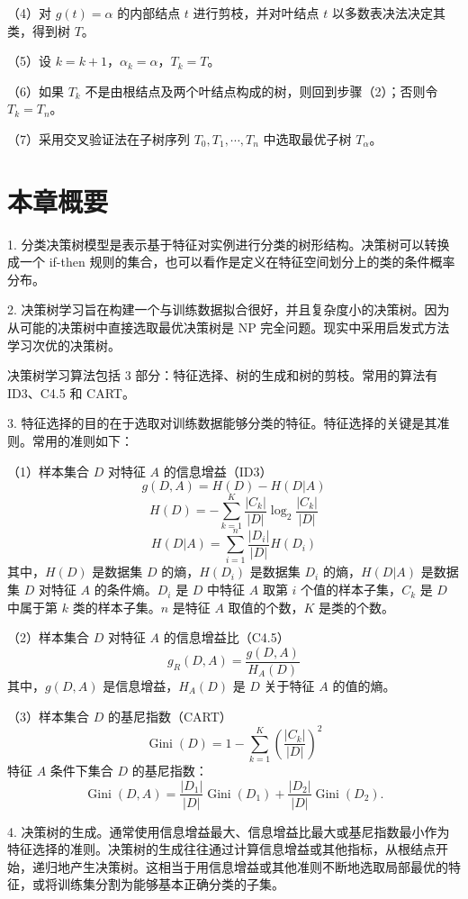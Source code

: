 \documentclass[UTF8,12pt,a4paper,fontset=fandol]{ctexart}
\begin{document}
（4）对 $g(t)=\alpha$ 的内部结点 $t$ 进行剪枝，并对叶结点 $t$ 以多数表决法决定其类，得到树 $T$。

（5）设 $k=k+1$，$\alpha_k=\alpha$，$T_k=T$。

（6）如果 $T_k$ 不是由根结点及两个叶结点构成的树，则回到步骤（2）；否则令 $T_k=T_n$。

（7）采用交叉验证法在子树序列 $T_0,T_1,\cdots,T_n$ 中选取最优子树 $T_\alpha$。

\section*{本章概要}

1. 分类决策树模型是表示基于特征对实例进行分类的树形结构。决策树可以转换成一个 if-then 规则的集合，也可以看作是定义在特征空间划分上的类的条件概率分布。

2. 决策树学习旨在构建一个与训练数据拟合很好，并且复杂度小的决策树。因为从可能的决策树中直接选取最优决策树是 NP 完全问题。现实中采用启发式方法学习次优的决策树。

决策树学习算法包括 3 部分：特征选择、树的生成和树的剪枝。常用的算法有 ID3、C4.5 和 CART。

3. 特征选择的目的在于选取对训练数据能够分类的特征。特征选择的关键是其准则。常用的准则如下：

（1）样本集合 $D$ 对特征 $A$ 的信息增益（ID3）
\[
  g(D,A)=H(D)-H(D|A)
\]
\[
  H(D)=-\sum_{k=1}^{K}\frac{|C_k|}{|D|}\log_2\frac{|C_k|}{|D|}
\]
\[
  H(D|A)=\sum_{i=1}^{n}\frac{|D_i|}{|D|}H(D_i)
\]
其中，$H(D)$ 是数据集 $D$ 的熵，$H(D_i)$ 是数据集 $D_i$ 的熵，$H(D|A)$ 是数据集 $D$ 对特征 $A$ 的条件熵。$D_i$ 是 $D$ 中特征 $A$ 取第 $i$ 个值的样本子集，$C_k$ 是 $D$ 中属于第 $k$ 类的样本子集。$n$ 是特征 $A$ 取值的个数，$K$ 是类的个数。

（2）样本集合 $D$ 对特征 $A$ 的信息增益比（C4.5）
\[
  g_R(D,A)=\frac{g(D,A)}{H_A(D)}
\]
其中，$g(D,A)$ 是信息增益，$H_A(D)$ 是 $D$ 关于特征 $A$ 的值的熵。

（3）样本集合 $D$ 的基尼指数（CART）
\[
  \operatorname{Gini}(D)=1-\sum_{k=1}^{K}\left(\frac{|C_k|}{|D|}\right)^2
\]
特征 $A$ 条件下集合 $D$ 的基尼指数：
\[
  \operatorname{Gini}(D,A)=\frac{|D_1|}{|D|}\operatorname{Gini}(D_1)
  +\frac{|D_2|}{|D|}\operatorname{Gini}(D_2).
\]

4. 决策树的生成。通常使用信息增益最大、信息增益比最大或基尼指数最小作为特征选择的准则。决策树的生成往往通过计算信息增益或其他指标，从根结点开始，递归地产生决策树。这相当于用信息增益或其他准则不断地选取局部最优的特征，或将训练集分割为能够基本正确分类的子集。
\end{document}
